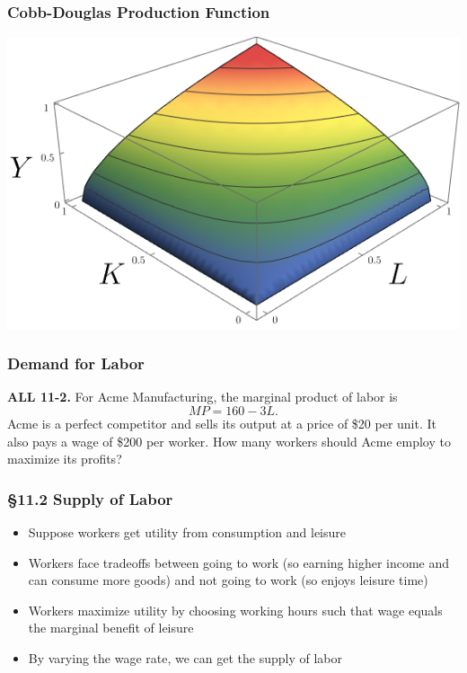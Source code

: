 \documentclass[12pt, xcolor=dvipsnames]{beamer}
\begin{document}
\begin{frame}
\frametitle{\bf Cobb-Douglas Production Function}
\begin{center}
\includegraphics[width=\linewidth]{figures/Cobb_douglas.png}
\end{center}
\end{frame}


\begin{frame}
\frametitle{\bf Demand for Labor}
\textsf{\bfseries ALL 11-2.} 
For Acme Manufacturing, the marginal product of labor is \[MP = 160 - 3L.\] Acme is a perfect competitor and sells its output at a price of \$20 per unit. It also pays a wage of \$200 per worker. How many workers should Acme employ to maximize its profits?
\end{frame}


\begin{frame}
\frametitle{\bf §11.2 Supply of Labor}
\begin{itemize}
\item Suppose workers get utility from consumption and leisure
\item Workers face tradeoffs between going to work (so earning higher income and can consume more goods) and not going to work (so enjoys leisure time)
\item Workers maximize utility by choosing working hours such that wage equals the marginal benefit of leisure
\item By varying the wage rate, we can get the supply of labor
\end{itemize}
\end{frame}
\end{document}
